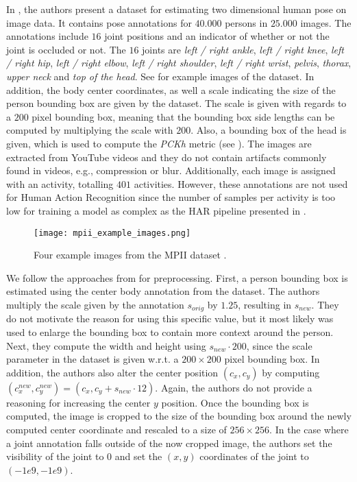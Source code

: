 In \cite{andriluka_2d_2014}, the authors present a dataset for estimating two dimensional human pose on image data.
It contains pose annotations for $40.000$ persons in $25.000$ images.
The annotations include $16$ joint positions and an indicator of whether or not the joint is occluded or not.
The $16$ joints are \textit{left / right ankle}, \textit{left / right knee}, \textit{left / right hip}, \textit{left / right elbow}, \textit{left / right shoulder}, \textit{left / right wrist}, \textit{pelvis}, \textit{thorax}, \textit{upper neck} and \textit{top of the head}.
See  for example images of the dataset.
In addition, the body center coordinates, as well a scale indicating the size of the person bounding box are given by the dataset.
The scale is given with regards to a $200$ pixel bounding box, meaning that the bounding box side lengths can be computed by multiplying the scale with $200$.
Also, a bounding box of the head is given, which is used to compute the \textit{PCKh} metric (see ).
The images are extracted from YouTube videos and they do not contain artifacts commonly found in videos, e.g., compression or blur.
Additionally, each image is assigned with an activity, totalling $401$ activities.
However, these annotations are not used for Human Action Recognition since the number of samples per activity is too low for training a model as complex as the HAR pipeline presented in .

\begin{figure}[htb!]
    \centering
    \texttt{[image: mpii\_example\_images.png]}
    \caption{Four example images from the MPII dataset \cite{andriluka_2d_2014}. }
    \label{fig:mpii_example_images}
\end{figure}

We follow the approaches from \cite{luvizon_2d/3d_2018} for preprocessing.
First, a person bounding box is estimated using the center body annotation from the dataset.
The authors multiply the scale given by the annotation $s_{orig}$ by $1.25$, resulting in $s_{new}$.
They do not motivate the reason for using this specific value, but it most likely was used to enlarge the bounding box to contain more context around the person.
Next, they compute the width and height using $s_{new} \cdot 200$, since the scale parameter in the dataset is given w.r.t. a $200 \times 200$ pixel bounding box.
In addition, the authors also alter the center position $(c_x,  c_y)$ by computing $(c_{x}^{new}, c_y^{new}) = (c_x, c_y + s_{new} \cdot 12)$.
Again, the authors do not provide a reasoning for increasing the center $y$ position.
Once the bounding box is computed, the image is cropped to the size of the bounding box around the newly computed center coordinate and rescaled to a size of $256 \times 256$.
In the case where a joint annotation falls outside of the now cropped image, the authors set the visibility of the joint to $0$ and set the $(x,y)$ coordinates of the joint to $(-1e9, -1e9)$.


